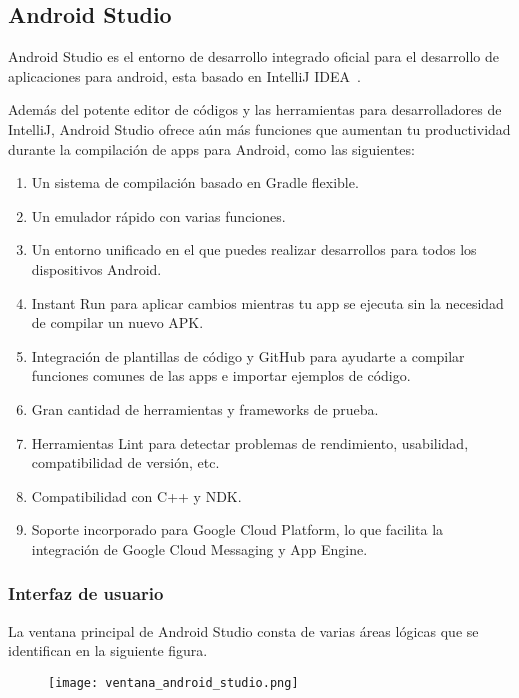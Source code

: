 \subsection{Android Studio}
Android Studio es el entorno de desarrollo integrado oficial para el 
desarrollo de aplicaciones para android, esta basado en IntelliJ IDEA~\cite{INTELLIJ}.

Además del potente editor de códigos y las herramientas 
para desarrolladores de IntelliJ, Android Studio ofrece aún
 más funciones que aumentan tu productividad durante la
 compilación de apps para Android, como las siguientes:

\begin{enumerate}
\item Un sistema de compilación basado en Gradle flexible.
\item Un emulador rápido con varias funciones.
\item Un entorno unificado en el que puedes realizar
 desarrollos para todos los dispositivos Android.
\item Instant Run para aplicar cambios mientras 
tu app se ejecuta sin la necesidad de compilar un nuevo APK.
\item Integración de plantillas de código y GitHub
 para ayudarte a compilar funciones comunes de las
 apps e importar ejemplos de código.
\item Gran cantidad de herramientas y frameworks
 de prueba.
\item Herramientas Lint para detectar problemas de
 rendimiento, usabilidad, compatibilidad de versión, etc.
\item Compatibilidad con C++ y NDK.
\item Soporte incorporado para Google Cloud Platform,
 lo que facilita la integración de Google Cloud Messaging 
y App Engine.
\end{enumerate}
\subsubsection{Interfaz de usuario}
La ventana principal de Android Studio consta 
de varias áreas lógicas que se identifican en la siguiente figura.
\linebreak 
\begin{figure}[h]
\texttt{[image: ventana\_android\_studio.png]} 
\end{figure}

